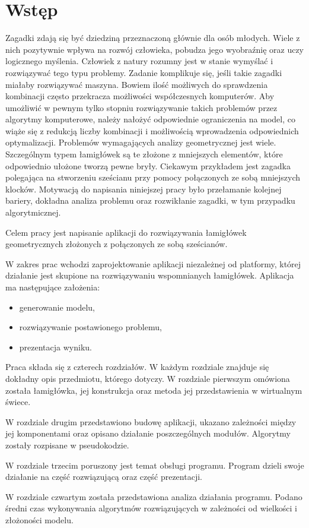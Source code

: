 \chapter{Wstęp}
\thispagestyle{chapterBeginStyle}
Zagadki zdają się być dziedziną przeznaczoną głównie dla osób młodych. Wiele z nich pozytywnie wpływa na rozwój człowieka, pobudza jego wyobraźnię oraz uczy logicznego myślenia. Człowiek z natury rozumny jest w stanie wymyślać i rozwiązywać tego typu problemy. Zadanie komplikuje się, jeśli takie zagadki miałaby rozwiązywać maszyna. Bowiem ilość możliwych do sprawdzenia kombinacji często przekracza możliwości współczesnych komputerów. Aby umożliwić w pewnym tylko stopniu rozwiązywanie takich  problemów przez algorytmy komputerowe, należy nałożyć odpowiednie ograniczenia na model, co wiąże się z redukcją liczby kombinacji i możliwością wprowadzenia odpowiednich optymalizacji. Problemów wymagających analizy geometrycznej jest wiele. Szczególnym typem łamigłówek są te złożone z mniejszych elementów, które odpowiednio ułożone tworzą pewne bryły. Ciekawym przykładem jest zagadka polegająca na stworzeniu sześcianu przy pomocy połączonych ze sobą mniejszych klocków. Motywacją do napisania niniejszej pracy było przełamanie kolejnej bariery, dokładna analiza problemu oraz rozwikłanie zagadki, w tym przypadku algorytmicznej.

Celem pracy jest napisanie aplikacji do rozwiązywania łamigłówek geometrycznych złożonych z połączonych ze sobą sześcianów.

W zakres prac wchodzi zaprojektowanie aplikacji niezależnej od platformy, której działanie jest skupione na rozwiązywaniu wspomnianych łamigłówek. Aplikacja ma następujące założenia:
\begin{itemize}
\item generowanie modelu,
\item rozwiązywanie postawionego problemu,
\item prezentacja wyniku.
\end{itemize}

Praca składa się z czterech rozdziałów. W każdym rozdziale znajduje się dokładny opis przedmiotu, którego dotyczy.
W rozdziale pierwszym omówiona została łamigłówka, jej konstrukcja oraz metoda jej przedstawienia w wirtualnym świece.

W rozdziale drugim przedstawiono budowę aplikacji, ukazano zależności między jej komponentami oraz  opisano działanie poszczególnych modułów. Algorytmy zostały rozpisane w pseudokodzie.

W rozdziale trzecim poruszony jest temat obsługi programu. Program dzieli swoje działanie na część rozwiązującą oraz część prezentacji.

W rozdziale czwartym została przedstawiona analiza działania programu. Podano średni czas wykonywania algorytmów rozwiązujących w zależności od wielkości i złożoności modelu.


